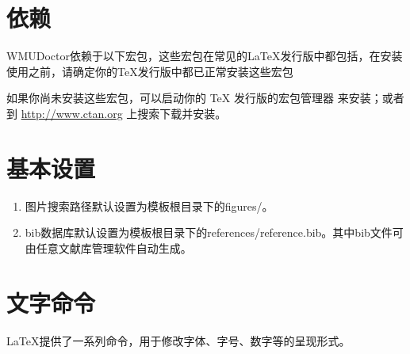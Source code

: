 \section{依赖}
WMUDoctor依赖于以下宏包，这些宏包在常见的\LaTeX{}发行版中都包括，在安装使用之前，请确定你的\TeX{}发行版中都已正常安装这些宏包
\begin{table}[H]
    \centering
\end{table}
如果你尚未安装这些宏包，可以启动你的 \TeX{} 发行版的宏包管理器
来安装；或者到 \url{http://www.ctan.org} 上搜索下载并安装。

\section{基本设置}

\begin{enumerate}[label=(\arabic*)]
    \item 图片搜索路径默认设置为模板根目录下的figures/。
    \item bib数据库默认设置为模板根目录下的references/reference.bib。其中bib文件可由任意文献库管理软件自动生成。
\end{enumerate}

\section{文字命令}
\LaTeX 提供了一系列命令，用于修改字体、字号、数字等的呈现形式。

